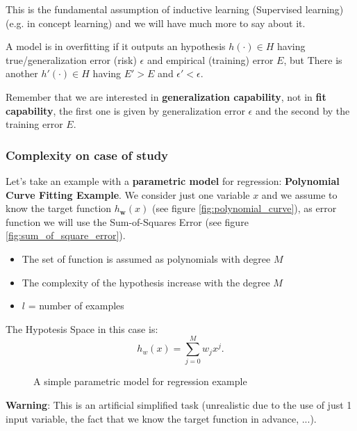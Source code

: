 \documentclass[../main.tex]{subfiles}
\begin{document}
This is the fundamental assumption of inductive learning (Supervised learning) (e.g. in concept learning) and we will have much more to say about it.

\begin{definition}[Overfitting]
    A model is in overfitting if it outputs an hypothesis $h(\cdot) \in H$ having true/generalization error (risk) $\epsilon$ and empirical (training) error $E$, but There is another  $h'(\cdot) \in H$ having $E' > E$ and $\epsilon' < \epsilon$.
\end{definition}
Remember that we are interested in \textbf{generalization capability}, not in \textbf{fit capability}, the first one is given by generalization error $\epsilon$ and the second by the training error $E$.

\subsubsection{Complexity on case of study}
Let's take an example with a \textbf{parametric model} for regression: \textbf{Polynomial Curve Fitting Example}.
We consider just one variable $x$ and we assume to know the target function $h_{\boldsymbol{w}}(x)$ (see figure \ref{fig:polynomial_curve}), as error function we will use the Sum-of-Squares Error (see figure \ref{fig:sum_of_square_error}).

\begin{itemize}
    \item The set of function is assumed as polynomials with degree $M$
    \item The complexity of the hypothesis increase with the degree $M$
    \item $l$ = number of examples
\end{itemize}

The Hypotesis Space in this case is:
\[
    h_w(x) = \sum_{j=0}^{M} w_j x^j
.\] 

\begin{figure}[ht]
  \centering
  \hfill
  \caption{A simple parametric model for regression example}
\end{figure}

\textbf{Warning}: This is an artificial simplified task (unrealistic due to the use of just 1 input variable, the fact that we know the target function in advance, ...).
\end{document}
